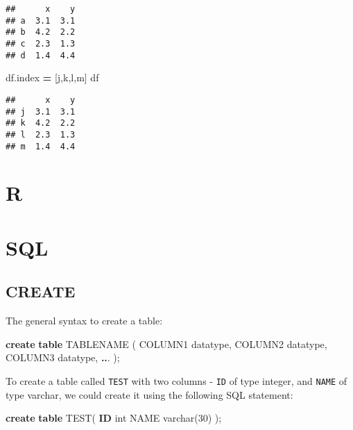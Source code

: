 \documentclass[
]{book}
\newenvironment{Shaded}{\begin{snugshade}}{\end{snugshade}}
\newcommand{\DataTypeTok}[1]{\textcolor[rgb]{0.13,0.29,0.53}{#1}}
\newcommand{\DecValTok}[1]{\textcolor[rgb]{0.00,0.00,0.81}{#1}}
\newcommand{\KeywordTok}[1]{\textcolor[rgb]{0.13,0.29,0.53}{\textbf{#1}}}
\newcommand{\NormalTok}[1]{#1}
\newcommand{\OperatorTok}[1]{\textcolor[rgb]{0.81,0.36,0.00}{\textbf{#1}}}
\newcommand{\StringTok}[1]{\textcolor[rgb]{0.31,0.60,0.02}{#1}}
\begin{document}
\begin{verbatim}
##      x    y
## a  3.1  3.1
## b  4.2  2.2
## c  2.3  1.3
## d  1.4  4.4
\end{verbatim}

\begin{Shaded}
\begin{Highlighting}[]
\NormalTok{df.index }\OperatorTok{=}\NormalTok{ [}\StringTok{\textquotesingle{}j\textquotesingle{}}\NormalTok{,}\StringTok{\textquotesingle{}k\textquotesingle{}}\NormalTok{,}\StringTok{\textquotesingle{}l\textquotesingle{}}\NormalTok{,}\StringTok{\textquotesingle{}m\textquotesingle{}}\NormalTok{]}
\NormalTok{df}
\end{Highlighting}
\end{Shaded}

\begin{verbatim}
##      x    y
## j  3.1  3.1
## k  4.2  2.2
## l  2.3  1.3
## m  1.4  4.4
\end{verbatim}

\hypertarget{r}{%
\chapter{R}\label{r}}

\hypertarget{sql}{%
\chapter{SQL}\label{sql}}

\hypertarget{create}{%
\section{CREATE}\label{create}}

The general syntax to create a table:

\begin{Shaded}
\begin{Highlighting}[]
\KeywordTok{create} \KeywordTok{table}\NormalTok{ TABLENAME (}
\NormalTok{  COLUMN1 datatype, }
\NormalTok{  COLUMN2 datatype, }
\NormalTok{  COLUMN3 datatype, }
  \OperatorTok{..}\NormalTok{. );}
\end{Highlighting}
\end{Shaded}

To create a table called \texttt{TEST} with two columns - \texttt{ID} of type integer, and \texttt{NAME} of type varchar, we could create it using the following SQL statement:

\begin{Shaded}
\begin{Highlighting}[]
\KeywordTok{create} \KeywordTok{table}\NormalTok{ TEST(}
  \KeywordTok{ID} \DataTypeTok{int}
\NormalTok{  NAME }\DataTypeTok{varchar}\NormalTok{(}\DecValTok{30}\NormalTok{)}
\NormalTok{);}
\end{Highlighting}
\end{Shaded}
\end{document}
